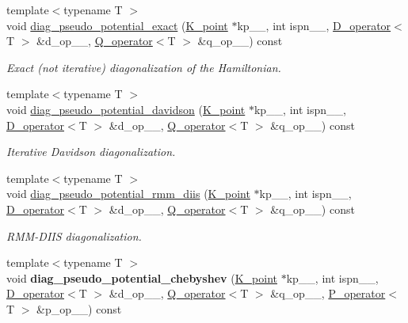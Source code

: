 \begin{DoxyCompactItemize}
\item 
{\footnotesize template$<$typename T $>$ }\\void \hyperlink{classsirius_1_1_band_aeeef6350cde82c79b7ac3e3e7343a103}{diag\+\_\+pseudo\+\_\+potential\+\_\+exact} (\hyperlink{classsirius_1_1_k__point}{K\+\_\+point} $\ast$kp\+\_\+\+\_\+, int ispn\+\_\+\+\_\+, \hyperlink{classsirius_1_1_d__operator}{D\+\_\+operator}$<$T $>$ \&d\+\_\+op\+\_\+\+\_\+, \hyperlink{classsirius_1_1_q__operator}{Q\+\_\+operator}$<$T $>$ \&q\+\_\+op\+\_\+\+\_\+) const 
\begin{DoxyCompactList}\small\item\em Exact (not iterative) diagonalization of the Hamiltonian. \end{DoxyCompactList}\item 
{\footnotesize template$<$typename T $>$ }\\void \hyperlink{classsirius_1_1_band_a6def3c3503a012beffdb603f42ac40ef}{diag\+\_\+pseudo\+\_\+potential\+\_\+davidson} (\hyperlink{classsirius_1_1_k__point}{K\+\_\+point} $\ast$kp\+\_\+\+\_\+, int ispn\+\_\+\+\_\+, \hyperlink{classsirius_1_1_d__operator}{D\+\_\+operator}$<$T $>$ \&d\+\_\+op\+\_\+\+\_\+, \hyperlink{classsirius_1_1_q__operator}{Q\+\_\+operator}$<$T $>$ \&q\+\_\+op\+\_\+\+\_\+) const 
\begin{DoxyCompactList}\small\item\em Iterative Davidson diagonalization. \end{DoxyCompactList}\item 
{\footnotesize template$<$typename T $>$ }\\void \hyperlink{classsirius_1_1_band_af3271dc285f20a4445587b9c031fbdb5}{diag\+\_\+pseudo\+\_\+potential\+\_\+rmm\+\_\+diis} (\hyperlink{classsirius_1_1_k__point}{K\+\_\+point} $\ast$kp\+\_\+\+\_\+, int ispn\+\_\+\+\_\+, \hyperlink{classsirius_1_1_d__operator}{D\+\_\+operator}$<$T $>$ \&d\+\_\+op\+\_\+\+\_\+, \hyperlink{classsirius_1_1_q__operator}{Q\+\_\+operator}$<$T $>$ \&q\+\_\+op\+\_\+\+\_\+) const 
\begin{DoxyCompactList}\small\item\em R\+M\+M-\/\+D\+I\+I\+S diagonalization. \end{DoxyCompactList}\item 
\hypertarget{classsirius_1_1_band_a6c3038b6cccb24d8d4437a15b115cca4}{}{\footnotesize template$<$typename T $>$ }\\void {\bfseries diag\+\_\+pseudo\+\_\+potential\+\_\+chebyshev} (\hyperlink{classsirius_1_1_k__point}{K\+\_\+point} $\ast$kp\+\_\+\+\_\+, int ispn\+\_\+\+\_\+, \hyperlink{classsirius_1_1_d__operator}{D\+\_\+operator}$<$T $>$ \&d\+\_\+op\+\_\+\+\_\+, \hyperlink{classsirius_1_1_q__operator}{Q\+\_\+operator}$<$T $>$ \&q\+\_\+op\+\_\+\+\_\+, \hyperlink{classsirius_1_1_p__operator}{P\+\_\+operator}$<$T $>$ \&p\+\_\+op\+\_\+\+\_\+) const \label{classsirius_1_1_band_a6c3038b6cccb24d8d4437a15b115cca4}


\end{DoxyCompactItemize}
